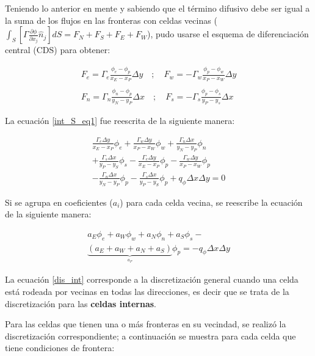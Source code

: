 \documentclass[article,latterpaper]{IEEEtran}
\begin{document}
Teniendo lo anterior en mente y sabiendo que el término difusivo debe ser igual a la suma de los flujos en las fronteras con celdas vecinas ($ \int_S \left[ \Gamma \frac{\partial \phi}{\partial x_j} \hat{n}_j \right] dS = F_N + F_S + F_E + F_W $), pudo usarse el esquema de diferenciación central (CDS) para obtener:

\begin{equation*}
    \begin{split}
    F_e = \Gamma_e \frac{\phi_e-\phi_p}{x_E - x_P} \Delta y \quad ; \quad  F_w = -\Gamma_w \frac{\phi_p-\phi_w}{x_P - x_W} \Delta y \\
    \\[0.1cm]    
    F_n = \Gamma_n \frac{\phi_n-\phi_p}{y_N - y_P} \Delta x \quad ; \quad  F_s = -\Gamma_s \frac{\phi_p-\phi_s}{y_P - y_s} \Delta x        
    \end{split}    
\end{equation*}

La ecuación \eqref{int_S_eq1} fue reescrita de la siguiente manera:

\begin{multline}
    \frac{\Gamma_e \Delta y}{x_E-x_P} \phi_e + \frac{\Gamma_w \Delta y}{x_P-x_W} \phi_w + \frac{\Gamma_n \Delta x}{y_N-y_P} \phi_n \\
    + \frac{\Gamma_s \Delta x}{y_P-y_S} \phi_s - \frac{\Gamma_e \Delta y}{x_E-x_P} \phi_p - \frac{\Gamma_w \Delta y}{x_P-x_W} \phi_p \\
    - \frac{\Gamma_n \Delta x}{y_N-y_P} \phi_p - \frac{\Gamma_s \Delta x}{y_P-y_S} \phi_p + q_{\phi} \Delta x \Delta y  = 0
\end{multline}

Si se agrupa en coeficientes ($a_i$) para cada celda vecina, se reescribe la ecuación de la siguiente manera:

\begin{multline}
    a_E\phi_e + a_W\phi_w + a_N\phi_n + a_S\phi_s - \\
    \underbrace{(a_E+a_W+a_N+a_S)}_{\overset{a_P}{}} \phi_p = -q_{\phi} \Delta x \Delta y 
    \label{dis_int}
\end{multline}

La ecuación \eqref{dis_int} corresponde a la discretización general cuando una celda está rodeada por vecinas en todas las direcciones, es decir que se trata de la discretización para las \textbf{celdas internas}. 

Para las celdas que tienen una o más fronteras en su vecindad, se realizó la discretización correspondiente; a continuación se muestra para cada celda que tiene condiciones de frontera:
\end{document}
